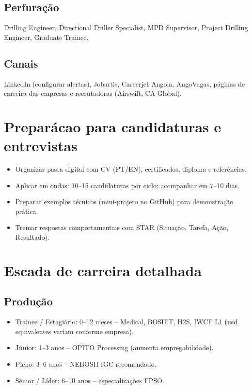 \documentclass[11pt,openany]{book}
\begin{document}
\subsection{Perfura\c{c}\~ao}
Drilling Engineer, Directional Driller Specialist, MPD Supervisor, Project Drilling Engineer, Graduate Trainee.

\subsection{Canais}
LinkedIn (configurar alertas), Jobartis, Careerjet Angola, AngoVagas, p\'aginas de carreira das empresas e recrutadoras (Airswift, CA Global).

\section{Prepar\'acao para candidaturas e entrevistas}
\begin{itemize}
  \item Organizar pasta digital com CV (PT/EN), certificados, diploma e refer\^encias.
  \item Aplicar em ondas: 10--15 candidaturas por ciclo; acompanhar em 7--10 dias.
  \item Preparar exemplos t\'ecnicos (mini-projeto no GitHub) para demonstra\c{c}\~ao pr\'atica.
  \item Treinar respostas comportamentais com STAR (Situa\c{c}\~ao, Tarefa, A\c{c}\~ao, Resultado).
\end{itemize}

\section{Escada de carreira detalhada}
\subsection{Produ\c{c}\~ao}
\begin{itemize}
  \item Trainee / Estagi\'ario: 0--12 meses -- Medical, BOSIET, H2S, IWCF L1 (usd equivalentes variam conforme empresa).
  \item J\'unior: 1--3 anos -- OPITO Processing (aumenta empregabilidade).
  \item Pleno: 3--6 anos -- NEBOSH IGC recomendado.
  \item S\'enior / L\'ider: 6--10 anos -- especializa\c{c}\~oes FPSO.
\end{itemize}
\end{document}
